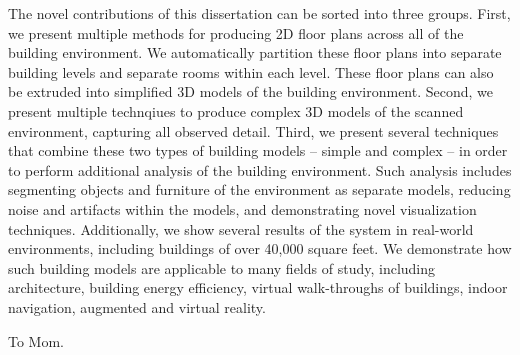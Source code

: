 \documentclass[12pt,onecolumn,oneside]{book}
\begin{document}
The novel contributions of this dissertation can be sorted into three groups.  First, we present multiple methods for producing 2D floor plans across all of the building environment.  We automatically partition these floor plans into separate building levels and separate rooms within each level.  These floor plans can also be extruded into simplified 3D models of the building environment.  Second, we present multiple technqiues to produce complex 3D models of the scanned environment, capturing all observed detail.  Third, we present several techniques that combine these two types of building models -- simple and complex -- in order to perform additional analysis of the building environment.  Such analysis includes segmenting objects and furniture of the environment as separate models, reducing noise and artifacts within the models, and demonstrating novel visualization techniques.  Additionally, we show several results of the system in real-world environments, including buildings of over 40,000 square feet.  We demonstrate how such building models are applicable to many fields of study, including architecture, building energy efficiency, virtual walk-throughs of buildings, indoor navigation, augmented and virtual reality.


\newpage
{}
\setcounter{page}{1}

\clearpage
\vspace*{\fill}
\begin{center}
To Mom.
\end{center}
\vfill %
\clearpage

\tableofcontents{}

\cleardoublepage
{}
{}
\listoffigures{}

\cleardoublepage
{}
{}
\listoftables{}
\end{document}
